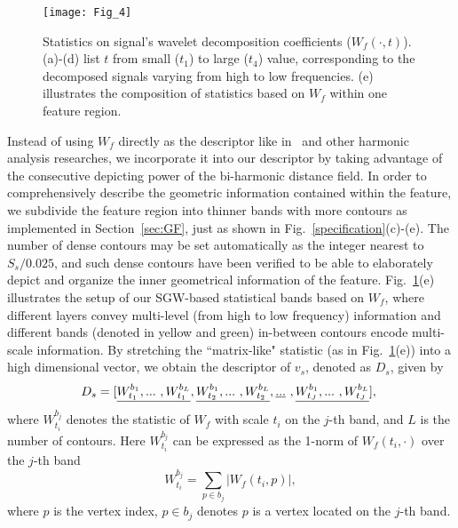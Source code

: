 \begin{figure}[!to]
\begin{center}
\texttt{[image: Fig\_4]}
\end{center}
\caption[Statistics on wavelet decomposition coefficients.]
  {Statistics on signal's wavelet decomposition coefficients
  ($W_f(\cdot,t)$). (a)-(d) list $t$ from small ($t_1$) to large
  ($t_4$) value, corresponding to the decomposed signals varying from
  high to low frequencies. (e) illustrates the composition of
  statistics based on $W_f$ within one feature region.}
\label{wmd}
\end{figure}

Instead of using $W_f$ directly as the descriptor like
in~\cite{Li:2013} and other harmonic analysis researches, we
incorporate it into our descriptor by taking advantage of the
consecutive depicting power of the bi-harmonic distance field. In
order to comprehensively describe the geometric information contained
within the feature, we subdivide the feature region into thinner bands
with more contours as implemented in Section~\ref{sec:GF}, just as
shown in Fig.~\ref{specification}(c)-(e). The number of dense contours
may be set automatically as the integer nearest to $S_{s}/0.025$, and
such dense contours have been verified to be able to elaborately
depict and organize the inner geometrical information of the feature.
Fig.~\ref{wmd}(e) illustrates the setup of our SGW-based statistical
bands based on $W_f$, where different layers convey multi-level (from
high to low frequency) information and different bands (denoted in
yellow and green) in-between contours encode multi-scale information.
By stretching the ``matrix-like" statistic (as in Fig.~\ref{wmd}(e))
into a high dimensional vector, we obtain the descriptor of $v_s$,
denoted as $D_s$, given by
\begin{equation}
\label{eq:Des}
\hspace{-1.2mm}
D_s=[\underline{W_{t_1}^{b_1},...\ ,W_{t_1}^{b_L}},\\
\underline{W_{t_2}^{b_1},...\ ,W_{t_2}^{b_L}},\\
\underline{...}\ , \\
\underline{W_{t_J}^{b_1},...\ ,W_{t_J}^{b_L}}],
\end{equation}
where $W_{t_i}^{b_j}$ denotes the statistic of $W_f$ with scale $t_i$
on the $j$-th band, and $L$ is the number of contours. Here
$W_{t_i}^{b_j}$ can be expressed as the 1-norm of $W_f(t_i, \cdot)$
over the $j$-th band
\begin{equation}
\label{eq:WMD_sta}
W_{t_i}^{b_j} = \sum_{p \in b_j}| W_f(t_i,p)|,
\end{equation}
where $p$ is the vertex index, $p \in b_j$ denotes $p$ is a vertex
located on the $j$-th band.

